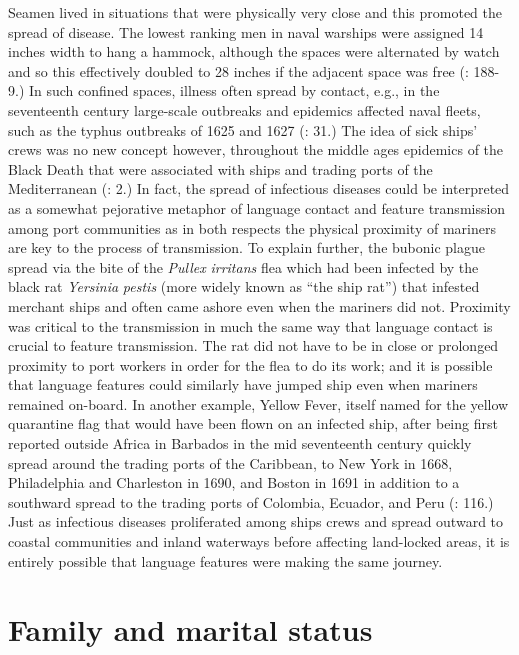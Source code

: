 Seamen lived in situations that were physically very close and this promoted the spread of disease. The lowest ranking men in naval warships were assigned 14 inches width to hang a hammock, although the spaces were alternated by watch and so this effectively doubled to 28 inches if the adjacent space was free (\citealt{AdkinsAdkins2008}: 188-9.) In such confined spaces, illness often spread by contact, e.g., in the seventeenth century large-scale outbreaks and epidemics affected naval fleets, such as the typhus outbreaks of 1625 and 1627 (\citealt{Brown2011}: 31.) The idea of sick ships’ crews was no new concept however, throughout the middle ages epidemics of the Black Death that were associated with ships and trading ports of the Mediterranean (\citealt{Brown2011}: 2.) In fact, the spread of infectious diseases could be interpreted as a somewhat pejorative metaphor of language contact and feature transmission among port communities as in both respects the physical proximity of mariners are key to the process of transmission. To explain further, the bubonic plague spread via the bite of the \textit{Pullex} \textit{irritans} flea which had been infected by the black rat \textit{Yersinia} \textit{pestis} (more widely known as “the ship rat”) that infested merchant ships and often came ashore even when the mariners did not. Proximity was critical to the transmission in much the same way that language contact is crucial to feature transmission. The rat did not have to be in close or prolonged proximity to port workers in order for the flea to do its work; and it is possible that language features could similarly have jumped ship even when mariners remained on-board. In another example, Yellow Fever, itself named for the yellow quarantine flag that would have been flown on an infected ship, after being first reported outside Africa in Barbados in the mid seventeenth century quickly spread around the trading ports of the Caribbean, to New York in 1668, Philadelphia and Charleston in 1690, and Boston in 1691 in addition to a southward spread to the trading ports of Colombia, Ecuador, and Peru (\citealt{Brown2011}: 116.) Just as infectious diseases proliferated among ships crews and spread outward to coastal communities and inland waterways before affecting land-locked areas, it is entirely possible that language features were making the same journey. 

\section{\textbf{Family} \textbf{and} \textbf{marital} \textbf{status}}%

